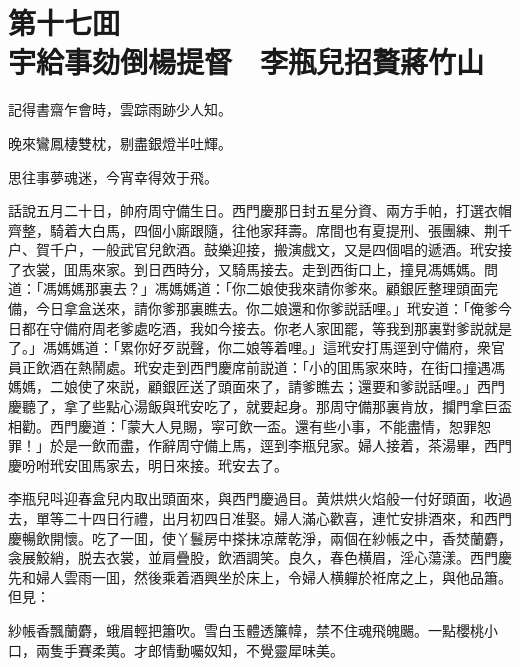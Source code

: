 
\chapter*{第十七囬　\\宇給事劾倒楊提督　李瓶兒招贅蔣竹山}


\begin{myquote}
記得書齋乍會時，雲踪雨跡少人知。

晚來鸞鳳棲雙枕，剔盡銀燈半吐輝。

思往事夢魂迷，今宵幸得效于飛。
\end{myquote}

話說五月二十日，帥府周守備生日。西門慶那日封五星分資、兩方手帕，打選衣帽齊整，騎着大白馬，四個小廝跟隨，往他家拜壽。席間也有夏提刑、張團練、荆千户、賀千户，一般武官兒飲酒。鼓樂迎接，搬演戲文，又是四個唱的遞酒。玳安接了衣裳，囬馬來家。到日西時分，又騎馬接去。走到西街口上，撞見馮媽媽。問道：「馮媽媽那裏去？」馮媽媽道：「你二娘使我來請你爹來。顧銀匠整理頭面完備，今日拿盒送來，請你爹那裏瞧去。你二娘還和你爹説話哩。」玳安道：「俺爹今日都在守備府周老爹處吃酒，我如今接去。你老人家囬罷，等我到那裏對爹説就是了。」馮媽媽道：「累你好歹説聲，你二娘等着哩。」這玳安打馬逕到守備府，衆官員正飲酒在熱鬧處。玳安走到西門慶席前説道：「小的囬馬家來時，在街口撞遇馮媽媽，二娘使了來説，顧銀匠送了頭面來了，請爹瞧去；還要和爹説話哩。」西門慶聽了，拿了些點心湯飯與玳安吃了，就要起身。那周守備那裏肯放，攔門拿巨盃相勸。西門慶道：「蒙大人見賜，寜可飲一盃。還有些小事，不能盡情，恕罪恕罪！」於是一飲而盡，作辭周守備上馬，逕到李瓶兒家。婦人接着，茶湯畢，西門慶吩咐玳安囬馬家去，明日來接。玳安去了。

李瓶兒呌迎春盒兒内取出頭面來，與西門慶過目。黄烘烘火焰般一付好頭面，收過去，單等二十四日行禮，出月初四日准娶。婦人滿心歡喜，連忙安排酒來，和西門慶暢飲開懷。吃了一囬，使丫鬟房中搽抹凉蓆乾淨，兩個在紗帳之中，香焚蘭麝，衾展鮫綃，脱去衣裳，並肩疊股，飲酒調笑。良久，春色横眉，淫心蕩漾。西門慶先和婦人雲雨一囬，然後乘着酒興坐於床上，令婦人横軃於袵席之上，與他品簫。但見：

\begin{myquote}
紗帳香飄蘭麝，蛾眉輕把簫吹。雪白玉體透簾幃，禁不住魂飛魄颺。一點櫻桃小口，兩隻手賽柔荑。才郎情動囑奴知，不覺靈犀味美。
\end{myquote}

